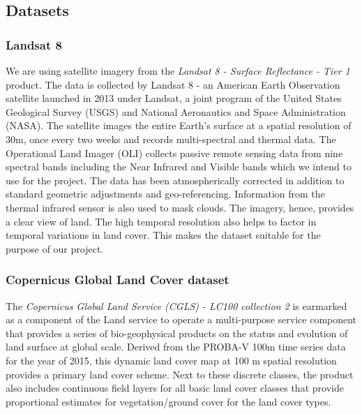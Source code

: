 \documentclass[12pt, a4paper]{report}
\begin{document}
\subsection{Datasets}
\subsubsection{Landsat 8}
We are using satellite imagery from the \textit{Landsat 8 - Surface Reflectance - Tier 1} product. The data is collected by Landsat 8 - an American Earth Observation satellite launched in 2013 under Landsat, a joint program of the United States Geological Survey (USGS) and National Aeronautics and Space Administration (NASA). The satellite images the entire Earth's surface at a spatial resolution of 30m, once every two weeks and records multi-spectral and thermal data. The Operational Land Imager (OLI) collects passive remote sensing data from nine spectral bands including the Near Infrared and Visible bands which we intend to use for the project. The data has been atmospherically corrected in addition to standard geometric adjustments and geo-referencing. Information from the thermal infrared sensor is also used to mask clouds. The imagery, hence, provides a clear view of land. The high temporal resolution also helps to factor in temporal variations in land cover. This makes the dataset suitable for the purpose of our project.\cite{geel8, l8}
\subsubsection{Copernicus Global Land Cover dataset}
The \textit{Copernicus Global Land Service (CGLS) - LC100 collection 2} is earmarked as a component of the Land service to operate a multi-purpose service component that provides a series of bio-geophysical products on the status and evolution of land surface at global scale. Derived from the PROBA-V 100m time series data for the year of 2015, this dynamic land cover map at 100 m spatial resolution provides a primary land cover scheme. Next to these discrete classes, the product also includes continuous field layers for all basic land cover classes that provide proportional estimates for vegetation/ground cover for the land cover types.\cite{geecglc}
\end{document}
